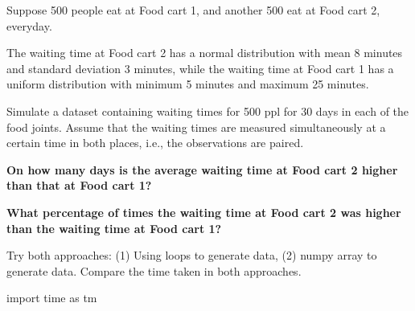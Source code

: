 \documentclass[
  letterpaper,
  DIV=11,
  numbers=noendperiod]{scrreprt}
\newenvironment{Shaded}{\begin{snugshade}}{\end{snugshade}}
\newcommand{\ImportTok}[1]{\textcolor[rgb]{0.00,0.46,0.62}{#1}}
\newcommand{\NormalTok}[1]{\textcolor[rgb]{0.00,0.23,0.31}{#1}}
\begin{document}
Suppose 500 people eat at Food cart 1, and another 500 eat at Food cart
2, everyday.

The waiting time at Food cart 2 has a normal distribution with mean 8
minutes and standard deviation 3 minutes, while the waiting time at Food
cart 1 has a uniform distribution with minimum 5 minutes and maximum 25
minutes.

Simulate a dataset containing waiting times for 500 ppl for 30 days in
each of the food joints. Assume that the waiting times are measured
simultaneously at a certain time in both places, i.e., the observations
are paired.

\textbf{On how many days is the average waiting time at Food cart 2
higher than that at Food cart 1?}

\textbf{What percentage of times the waiting time at Food cart 2 was
higher than the waiting time at Food cart 1?}

Try both approaches: (1) Using loops to generate data, (2) numpy array
to generate data. Compare the time taken in both approaches.

\begin{Shaded}
\begin{Highlighting}[]
\ImportTok{import}\NormalTok{ time }\ImportTok{as}\NormalTok{ tm}
\end{Highlighting}
\end{Shaded}
\end{document}
